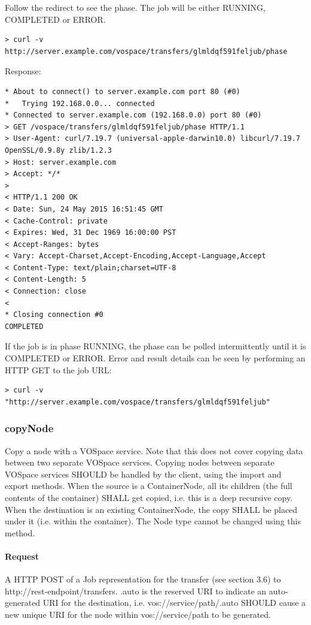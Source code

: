 \documentclass[11pt,a4paper]{ivoa}
\begin{document}
Follow the redirect to see the phase.  The job will be either RUNNING, COMPLETED or ERROR.
\begin{lstlisting}
> curl -v http://server.example.com/vospace/transfers/glmldqf591feljub/phase
\end{lstlisting}
Response:
\begin{lstlisting}
* About to connect() to server.example.com port 80 (#0)
*   Trying 192.168.0.0... connected
* Connected to server.example.com (192.168.0.0) port 80 (#0)
> GET /vospace/transfers/glmldqf591feljub/phase HTTP/1.1
> User-Agent: curl/7.19.7 (universal-apple-darwin10.0) libcurl/7.19.7 OpenSSL/0.9.8y zlib/1.2.3
> Host: server.example.com
> Accept: */*
>
< HTTP/1.1 200 OK
< Date: Sun, 24 May 2015 16:51:45 GMT
< Cache-Control: private
< Expires: Wed, 31 Dec 1969 16:00:00 PST
< Accept-Ranges: bytes
< Vary: Accept-Charset,Accept-Encoding,Accept-Language,Accept
< Content-Type: text/plain;charset=UTF-8
< Content-Length: 5
< Connection: close
<
* Closing connection #0
COMPLETED
\end{lstlisting}
If the job is in phase RUNNING, the phase can be polled intermittently until it is COMPLETED or ERROR.
Error and result details can be seen by performing an HTTP GET to the job URL:
\begin{lstlisting}
> curl -v "http://server.example.com/vospace/transfers/glmldqf591feljub"
\end{lstlisting}

\subsubsection{copyNode}
\label{subsubsec:copynode}
Copy a node with a VOSpace service.
Note that this does not cover copying data between two separate VOSpace services.
Copying nodes between separate VOSpace services SHOULD be handled by the client, using the import and export methods.
When the source is a ContainerNode, all its children (the full contents of the container) SHALL get copied, i.e. this is a deep recursive copy.
When the destination is an existing ContainerNode, the copy SHALL be placed under it (i.e. within the container).
The Node type cannot be changed using this method.

\paragraph{Request}
A HTTP POST of a Job representation for the transfer (see section 3.6) to http://rest-endpoint/transfers.
.auto is the reserved URI to indicate an auto-generated URI for the destination, i.e. vos://service/path/.auto SHOULD cause a new unique URI for the node within vos://service/path to be generated.
\end{document}
